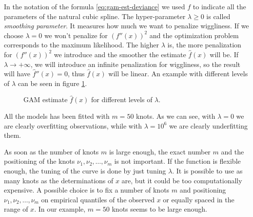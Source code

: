 \documentclass[a4paper, nobind]{templates/ociamthesis}
\theoremstyle{definition}
\theoremstyle{definition}
\theoremstyle{definition}
\theoremstyle{remark}
\begin{document}
In the notation of the formula \eqref{eq:gam-est-deviance} we used \(f\) to indicate all the parameters of the natural cubic spline. The hyper-parameter \(\lambda\ge0\) is called \emph{smoothing parameter}. It measures how much we want to penalize wiggliness. If we choose \(\lambda=0\) we won't penalize for \(\left( f''(x) \right)^2\) and the optimization problem corresponds to the maximum likelihood. The higher \(\lambda\) is, the more penalization for \(\left( f''(x) \right)^2\) we introduce and the smoother the estimate \(\hat{f}(x)\) will be. If \(\lambda\to+\infty\), we will introduce an infinite penalization for wiggliness, so the result will have \(\hat{f}''(x)=0\), thus \(\hat{f}(x)\) will be linear. An example with different levels of \(\lambda\) can be seen in figure \ref{fig:gam-lambda}.





\begin{figure}[!hbtp]

{\centering {}\newline{}

}

\caption{GAM estimate \(\hat{f}(x)\) for different levels of \(\lambda\).}\label{fig:gam-lambda}
\end{figure}

All the models has been fitted with \(m = 50\) knots. As we can see, with \(\lambda = 0\) we are clearly overfitting observations, while with \(\lambda = 10^6\) we are clearly underfitting them.

As soon as the number of knots \(m\) is large enough, the exact number \(m\) and the positioning of the knots \(\nu_1, \nu_2, \dots, \nu_m\) is not important. If the function is flexible enough, the tuning of the curve is done by just tuning \(\lambda\). It is possible to use as many knots as the determinations of \(x\) are, but it could be too computationally expensive. A possible choice is to fix a number of knots \(m\) and positioning \(\nu_1, \nu_2, \dots, \nu_m\) on empirical quantiles of the observed \(x\) or equally spaced in the range of \(x\). In our example, \(m=50\) knots seems to be large enough.
\end{document}

